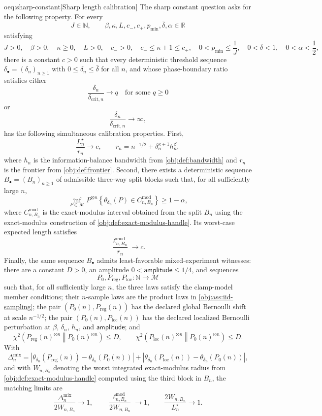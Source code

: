 \documentclass[11pt]{article}
\begin{document}
\begin{remarkv}{oeq:sharp-constant}[Sharp length calibration]
The sharp constant question asks for the following property. For every
\[
 J\in\mathbb N,\qquad
 \beta,\kappa,L,c_-,c_+,p_{\min},\bar\delta,\alpha\in\mathbb R
\]
satisfying
\[
 J>0,\quad \beta>0,\quad \kappa\geq0,\quad L>0,\quad c_->0,\quad
 c_-\leq \kappa+1\leq c_+,\quad
 0<p_{\min}\leq \frac1J,\quad
 0<\bar\delta<1,\quad 0<\alpha<\frac12,
\]
there is a constant \(c>0\) such that every deterministic threshold sequence
\(\delta_{\bullet}=(\delta_n)_{n\geq1}\) with \(0\leq\delta_n\leq\bar\delta\) for all \(n\), and whose phase-boundary ratio satisfies either
\[
 \frac{\delta_n}{\delta_{\mathrm{crit},n}}\longrightarrow q
 \quad\text{for some }q\geq0
\]
or
\[
 \frac{\delta_n}{\delta_{\mathrm{crit},n}}\longrightarrow\infty,
\]
has the following simultaneous calibration properties. First,
\[
 \frac{L_n^\star}{r_n}\longrightarrow c,
 \qquad
 r_n=n^{-1/2}+\delta_n^{\kappa+1}h_n^\beta,
\]
where \(h_n\) is the information-balance bandwidth from \cref{obj:def:bandwidth} and \(r_n\) is the frontier from \cref{obj:def:frontier}. Second, there exists a deterministic sequence
\(B_{\bullet}=(B_n)_{n\geq1}\) of admissible three-way split blocks such that, for all sufficiently large \(n\),
\[
 \inf_{P\in\mathcal M}
 P^{\otimes n}
 \left\{
   \theta_{\delta_n}(P)\in C^{\mathrm{mod}}_{n,B_n}
 \right\}
 \geq 1-\alpha,
\]
where \(C^{\mathrm{mod}}_{n,B_n}\) is the exact-modulus interval obtained from the split \(B_n\) using the exact-modulus construction of \cref{obj:def:exact-modulus-handle}. Its worst-case expected length satisfies
\[
 \frac{\ell^{\mathrm{mod}}_{n,B_n}}{r_n}\longrightarrow c.
\]
Finally, the same sequence \(B_{\bullet}\) admits least-favorable mixed-experiment witnesses: there are a constant \(D>0\), an amplitude \(0<\mathsf{amplitude}\leq1/4\), and sequences
\[
 P_0,P_{\mathrm{reg}},P_{\mathrm{loc}}:\mathbb N\to\mathcal M
\]
such that, for all sufficiently large \(n\), the three laws satisfy the clamp-model member conditions; their \(n\)-sample laws are the product laws in \cref{obj:ass:iid-sampling}; the pair \((P_0(n),P_{\mathrm{reg}}(n))\) has the declared global Bernoulli shift at scale \(n^{-1/2}\); the pair \((P_0(n),P_{\mathrm{loc}}(n))\) has the declared localized Bernoulli perturbation at \(\beta\), \(\delta_n\), \(h_n\), and \(\mathsf{amplitude}\); and
\[
 \chi^2\!\left(P_{\mathrm{reg}}(n)^{\otimes n}\middle\Vert P_0(n)^{\otimes n}\right)\leq D,
 \qquad
 \chi^2\!\left(P_{\mathrm{loc}}(n)^{\otimes n}\middle\Vert P_0(n)^{\otimes n}\right)\leq D.
\]
With
\[
 \Delta_n^{\mathrm{mix}}
 =
 \left|\theta_{\delta_n}\!\left(P_{\mathrm{reg}}(n)\right)-
          \theta_{\delta_n}\!\left(P_0(n)\right)\right|
  +
 \left|\theta_{\delta_n}\!\left(P_{\mathrm{loc}}(n)\right)-
          \theta_{\delta_n}\!\left(P_0(n)\right)\right|,
\]
and with \(W_{n,B_n}\) denoting the worst integrated exact-modulus radius from
\cref{obj:def:exact-modulus-handle} computed using the third block in \(B_n\), the matching limits are
\[
 \frac{\Delta_n^{\mathrm{mix}}}{2W_{n,B_n}}\longrightarrow1,
 \qquad
 \frac{\ell^{\mathrm{mod}}_{n,B_n}}{2W_{n,B_n}}\longrightarrow1,
 \qquad
 \frac{2W_{n,B_n}}{L_n^\star}\longrightarrow1.
\]
\end{remarkv}
\end{document}
